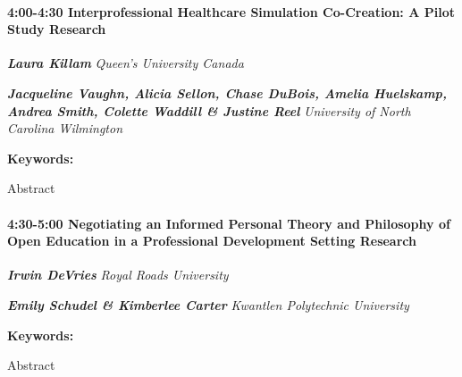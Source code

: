 \documentclass[
]{book}
\begin{document}
\begin{session}
\hypertarget{interprofessional-healthcare-simulation-co-creation-a-pilot-study-research}{%
\paragraph*{\texorpdfstring{4:00-4:30 \textbar{}
\textbf{Interprofessional Healthcare Simulation Co-Creation: A Pilot
Study} \textbar{}
Research}{4:00-4:30 \textbar{} Interprofessional Healthcare Simulation Co-Creation: A Pilot Study \textbar{} Research}}\label{interprofessional-healthcare-simulation-co-creation-a-pilot-study-research}}

\textbf{\emph{Laura Killam}} \textbar{} \emph{Queen's University Canada}

\textbf{\emph{Jacqueline Vaughn, Alicia Sellon, Chase DuBois, Amelia
Huelskamp, Andrea Smith, Colette Waddill \& Justine Reel}} \textbar{}
\emph{University of North Carolina Wilmington}

\textbf{Keywords:}

Abstract
\end{session}

\begin{session}
\hypertarget{negotiating-an-informed-personal-theory-and-philosophy-of-open-education-in-a-professional-development-setting-research}{%
\paragraph*{\texorpdfstring{4:30-5:00 \textbar{} \textbf{Negotiating an
Informed Personal Theory and Philosophy of Open Education in a
Professional Development Setting} \textbar{}
Research}{4:30-5:00 \textbar{} Negotiating an Informed Personal Theory and Philosophy of Open Education in a Professional Development Setting \textbar{} Research}}\label{negotiating-an-informed-personal-theory-and-philosophy-of-open-education-in-a-professional-development-setting-research}}

\textbf{\emph{Irwin DeVries}} \textbar{} \emph{Royal Roads University}

\textbf{\emph{Emily Schudel \& Kimberlee Carter}} \textbar{}
\emph{Kwantlen Polytechnic University}

\textbf{Keywords:}

Abstract
\end{session}
\end{document}
